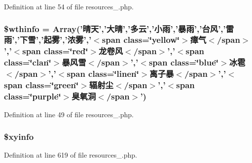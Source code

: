Definition at line 54 of file resources\+\_.\+php.

\hypertarget{resources__1_8php_a42c20343a70aaec3fcdbace0179e4eb2}{
\subsubsection[{\$wthinfo}]{\setlength{\rightskip}{0pt plus 5cm}\$wthinfo = Array('晴天','大晴','多云','小雨','暴雨','台风','雷雨','下雪','起雾','浓雾','$<$span class=\char`\"{}yellow\char`\"{}$>$瘴气$<$/span$>$','$<$span class=\char`\"{}red\char`\"{}$>$龙卷风$<$/span$>$','$<$span class=\char`\"{}clan\char`\"{}$>$暴风雪$<$/span$>$','$<$span class=\char`\"{}blue\char`\"{}$>$冰雹$<$/span$>$','$<$span class=\char`\"{}linen\char`\"{}$>$离子暴$<$/span$>$','$<$span class=\char`\"{}green\char`\"{}$>$辐射尘$<$/span$>$','$<$span class=\char`\"{}purple\char`\"{}$>$臭氧洞$<$/span$>$')}}\label{resources__1_8php_a42c20343a70aaec3fcdbace0179e4eb2}


Definition at line 49 of file resources\+\_.\+php.

\hypertarget{resources__1_8php_aabc8b00fb3b56eab2f2d6ff8e1f0839c}{
\subsubsection[{\$xyinfo}]{\setlength{\rightskip}{0pt plus 5cm}\$xyinfo}}\label{resources__1_8php_aabc8b00fb3b56eab2f2d6ff8e1f0839c}


Definition at line 619 of file resources\+\_.\+php.

